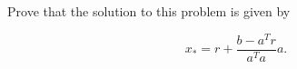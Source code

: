 Prove that the solution to this problem is given by

$$
x_* = r + \frac{b - a^T r}{a^T a} a.
$$

\begin{solution}
    \ \\
    \vfill
\end{solution}
